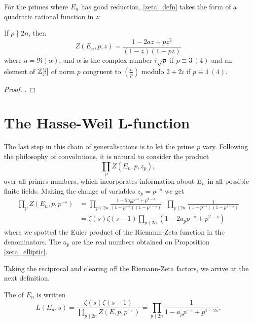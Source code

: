 \documentclass[12pt, a4paper]{report}
\begin{document}
For the primes where $E_n$ has good reduction, \autoref{zeta_defn} takes
the form of a quadratic rational function in $z$:

\begin{prop} \label{zeta_elliptic}
  If $p \nmid 2n$, then
  \[Z(E_n, p, z) = \frac{1 - 2az + pz^2}{(1-z)(1-pz)} \]
  where $a = \Re(\alpha)$, and $\alpha$ is the complex number
  $i\sqrt{p}$ if $p \equiv 3 \, (4)$ and an element of ${\mathbb Z}[i]$ of
  norm $p$ congruent to $(\frac{n}{p})$ modulo $2+2i$ if $p \equiv 1 \, (4)$. 
\end{prop}

\begin{proof}
  \cite[See][Chater II-2, pages 59-61]{modular}.
\end{proof}



\section{The Hasse-Weil L-function}

The last step in this chain of generalisations is to let the prime $p$ vary.
Following the
philosophy of convolutions, it is natural to consider the product
\[\prod\limits_{p} Z(E_n, p, z_p),\]
over all primes numbers,
which incorporates information about $E_n$ in all possible finite fields.
 Making
the change of variables $z_p = p^{-s}$ we get
\[
  \begin{split}
    \prod\limits_{p} Z(E_n, p, p^{-s}) &= \prod\limits_{p \nmid 2n}
    \frac{1-2a_pp^{-s} + p^{2-s}}{(1-p^{-s})(1-p^{1-s})} \cdot \prod\limits_{p \mid
      2n} \frac{1}{(1-p^{-s})(1-p^{1-s})} \\  &=\zeta(s) \zeta(s-1) \prod\limits_{p
      \nmid 2n} (1 - 2a_pp^{-s} + p^{2-s})
  \end{split}
\]
where we spotted the Euler product of the Riemann-Zeta function in the
denominators. The $a_p$ are the real numbers obtained on
Proposition \autoref{zeta_elliptic}.

Taking the reciprocal and clearing off the Riemann-Zeta factors, we arrive at
the next definition.

\begin{defn}
  The  of $E_n$ is written
  \begin{equation} \label{eq:lfunction}
    L(E_n, s) = \frac{\zeta(s) \zeta(s-1)}{\prod_{p \nmid 2n} Z(E, p, p^{-s})}
    = \prod\limits_{p \nmid 2n} \frac{1}{1-a_pp^{-s} + p^{1-2s}}.
  \end{equation}
\end{defn}
\end{document}
